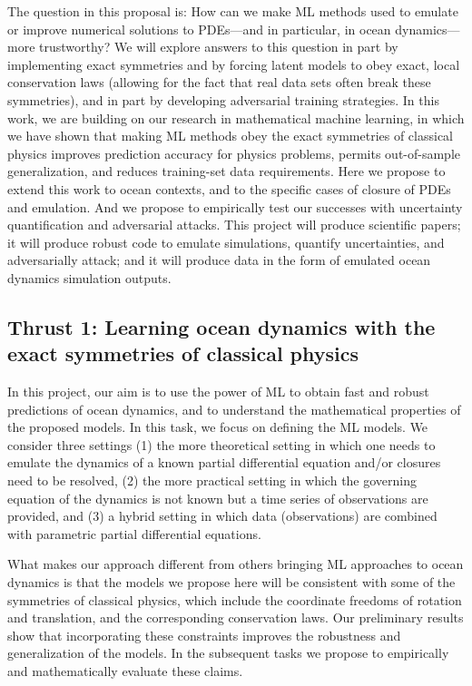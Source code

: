 \documentclass[11pt]{article}
\begin{document}
The question in this proposal is:
How can we make ML methods used to emulate or improve numerical solutions to PDEs---and in particular, in ocean dynamics---more trustworthy?
We will explore answers to this question in part by implementing exact symmetries and by forcing latent models to obey exact, local conservation laws (allowing for the fact that real data sets often break these symmetries), and in part by developing adversarial training strategies.
In this work, we are building on our research in mathematical machine learning, in which we have shown that making ML methods obey the exact symmetries of classical physics improves prediction accuracy for physics problems, permits out-of-sample generalization, and reduces training-set data requirements.
Here we propose to extend this work to ocean contexts, and to the specific cases of closure of PDEs and emulation.
And we propose to empirically test our successes with uncertainty quantification and adversarial attacks.
This project will produce scientific papers; it will produce robust code to emulate simulations, quantify uncertainties, and adversarially attack; and it will produce data in the form of emulated ocean dynamics simulation outputs.

\subsection{Thrust 1: Learning ocean dynamics with the exact symmetries of classical physics}

In this project, our aim is to use the power of ML to obtain fast and robust predictions of ocean dynamics, and to understand the mathematical properties of the proposed models. In this task, we focus on defining the ML models. We consider three settings (1) the more theoretical setting in which one needs to emulate the dynamics of a known partial differential equation and/or closures need to be resolved, (2) the more practical setting in which the governing equation of the dynamics is not known but a time series of observations are provided, and (3) a hybrid setting in which data (observations) are combined with parametric partial differential equations.

What makes our approach different from others bringing ML approaches to ocean dynamics is that the models we propose here will be consistent with some of the symmetries of classical physics, which include the coordinate freedoms of rotation and translation, and the corresponding conservation laws.
Our preliminary results show that incorporating these constraints improves the robustness and generalization of the models. In the subsequent tasks we propose to empirically and mathematically evaluate these claims.
\end{document}

